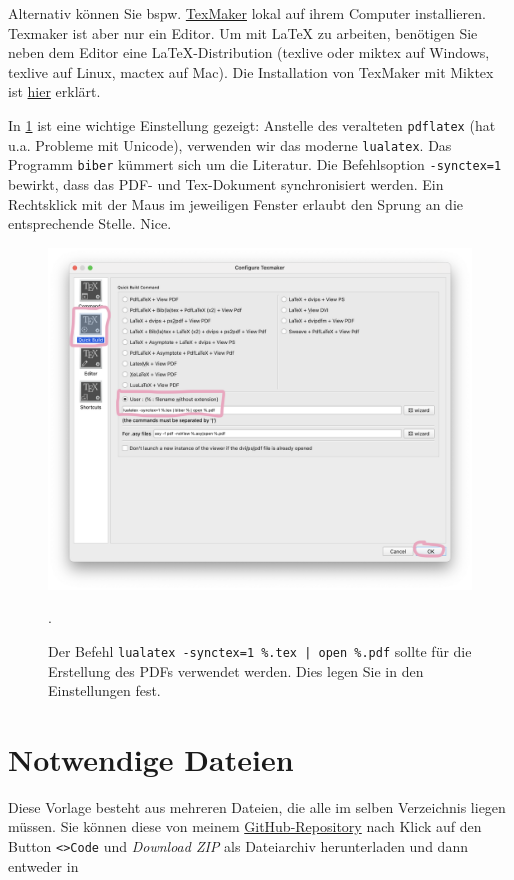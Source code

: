 Alternativ können Sie bspw. \href{https://www.xm1math.net/texmaker/}{TexMaker} lokal auf ihrem Computer installieren. Texmaker ist aber nur ein Editor. Um mit LaTeX zu arbeiten, benötigen Sie neben dem Editor eine LaTeX-Distribution (texlive oder miktex auf Windows, texlive auf Linux, mactex auf Mac). Die Installation von TexMaker mit Miktex ist \href{https://youtu.be/uKetjJTDSqk}{hier} erklärt.

In \cref{fig:texmaker} ist eine wichtige Einstellung gezeigt: Anstelle des veralteten \texttt{pdflatex} (hat u.a. Probleme mit Unicode), verwenden wir das moderne \texttt{lualatex}. Das Programm \texttt{biber} kümmert sich um die Literatur. Die Befehlsoption \texttt{-synctex=1} bewirkt, dass das PDF- und Tex-Dokument synchronisiert werden. Ein Rechtsklick mit der Maus im jeweiligen Fenster erlaubt den Sprung an die entsprechende Stelle. Nice.

\begin{figure}[h]
\centering
\includegraphics[width=.7\columnwidth]{texmaker.png}
\caption{Der Befehl \texttt{lualatex -synctex=1 \%.tex | open \%.pdf} sollte für die Erstellung des PDFs verwendet werden. Dies legen Sie in den Einstellungen fest.}.
\label{fig:texmaker}
\end{figure}

\section{Notwendige Dateien}
Diese Vorlage besteht aus mehreren Dateien, die alle im selben Verzeichnis liegen müssen. Sie können diese von meinem \href{https://github.com/awkologist/HSMW-Template-BioChem-Group}{GitHub-Repository} nach Klick auf den Button \verb+<>Code+ und \textit{Download ZIP} als Dateiarchiv herunterladen und dann entweder in

